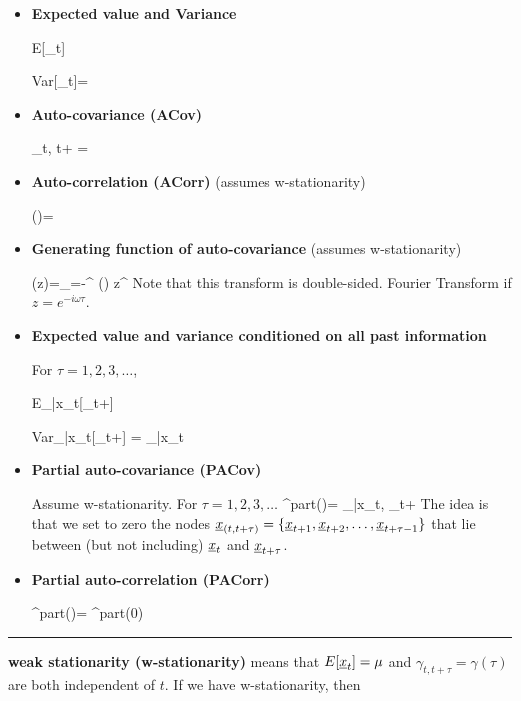 \begin{itemize}

\item {\bf Expected value and Variance}

\beq
E[\rvx_t]
\eeq

\beq
Var[\rvx_t]=
\eeq

\item{\bf Auto-covariance (ACov)}

\beq
\gamma_{t, t+\tau}
=
\eeq




\item{\bf Auto-correlation (ACorr)} (assumes
w-stationarity)

\beq
\rho(\tau)=
\eeq

\item {\bf Generating function
of auto-covariance} (assumes w-stationarity)


\beq
\TIL{\gamma}(z)=\sum_{\tau=-\infty}^{\infty}
\gamma(\tau) z^\tau
\eeq
Note that this transform is double-sided.
Fourier Transform
if $z=e^{-i\omega\tau}$.

\item{\bf Expected value
and variance conditioned on all past information}

For $\tau=1,2, 3, \dots$,

\beq
E_{|x_{\leq t}}[\rvx_{t+\tau}]
\eeq

\beq
Var_{|x_{\leq t}}[\rvx_{t+\tau}]
=
_{|x_{\leq t}}
\eeq

\item {\bf Partial auto-covariance (PACov)}

Assume w-stationarity.
For $\tau=1,2,3, \ldots$
\beq
\gamma^{part}(\tau)=
_{|x_{\leq t}, \rvx_{t+\tau}}
\eeq
The idea is that we set to zero the
nodes $\rvx_{(t, t+\tau)}=
\{\rvx_{t+1}, \rvx_{t+2}, \ldots,\rvx_{t+\tau-1}\}$
that lie
between
(but not including) $\rvx_t$ and $\rvx_{t+\tau}$.

\item {\bf Partial auto-correlation (PACorr)}


\beq
\rho^{part}(\tau)=
{\gamma^{part}(0)}
\eeq
\end{itemize}


\hrule

{\bf weak stationarity (w-stationarity)}
means that
$E[\rvx_t]=\mu$
and
$\gamma_{t, t+\tau}=\gamma(\tau)$
are both independent of $t$.
If we have w-stationarity,
then

